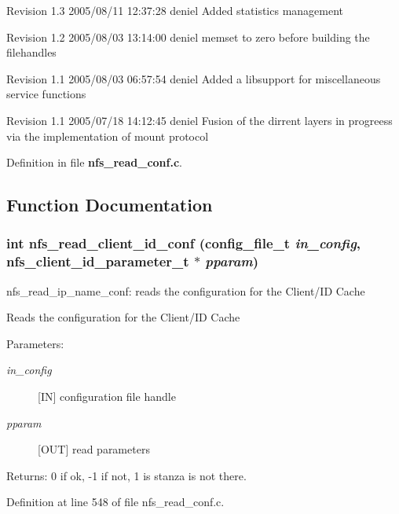 Revision 1.3 2005/08/11 12:37:28 deniel Added statistics management

Revision 1.2 2005/08/03 13:14:00 deniel memset to zero before building the filehandles

Revision 1.1 2005/08/03 06:57:54 deniel Added a libsupport for miscellaneous service functions

Revision 1.1 2005/07/18 14:12:45 deniel Fusion of the dirrent layers in progreess via the implementation of mount protocol

Definition in file {\bf nfs\_\-read\_\-conf.c}.

\subsection{Function Documentation}
\subsubsection{\setlength{\rightskip}{0pt plus 5cm}int nfs\_\-read\_\-client\_\-id\_\-conf (config\_\-file\_\-t {\em in\_\-config}, nfs\_\-client\_\-id\_\-parameter\_\-t $\ast$ {\em pparam})}\label{nfs__read__conf_8c_a4}


nfs\_\-read\_\-ip\_\-name\_\-conf: reads the configuration for the Client/ID Cache

Reads the configuration for the Client/ID Cache

\begin{Desc}
\item[Parameters:]
\begin{description}
\item[{\em in\_\-config}][IN] configuration file handle \item[{\em pparam}][OUT] read parameters\end{description}
\end{Desc}
\begin{Desc}
\item[Returns:]0 if ok, -1 if not, 1 is stanza is not there. \end{Desc}


Definition at line 548 of file nfs\_\-read\_\-conf.c.
